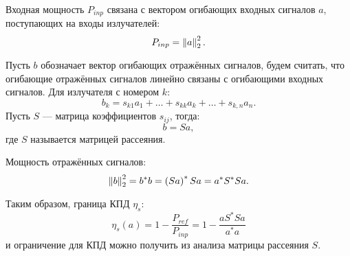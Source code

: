 Входная мощность $P_{inp}$ связана с вектором огибающих входных сигналов $a$, поступающих на входы излучателей:
\[
    P_{inp} = \left \| a \right \|_2^2 .
\]

Пусть $b$ обозначает вектор огибающих отражённых сигналов, будем считать, что огибающие отражённых сигналов линейно связаны с огибающими входных сигналов.
Для излучателя с номером $k$:
\[
    b_k = s_{k1} a_1 + \dots + s_{kk} a_k + \dots + s_{k,n} a_n.
\]
Пусть $S$ --- матрица коэффициентов $s_{ij}$, тогда:
\[
    b = S a ,
\]
где $S$ называется матрицей рассеяния.

Мощность отражённых сигналов:
\[
    \left \| b \right \|_2^2
    = b^* b
    = \left ( S a \right )^* S a
    = a^* S^* S a .
\]

Таким образом, граница КПД $\eta_s$:
\[
    \eta_s(a)
    = 1 - \frac{P_{ref}}{P_{inp}}
    = 1 - \frac{a S^* S a}{a^* a}
\]
и ограничение для КПД можно получить из анализа матрицы рассеяния $S$.

